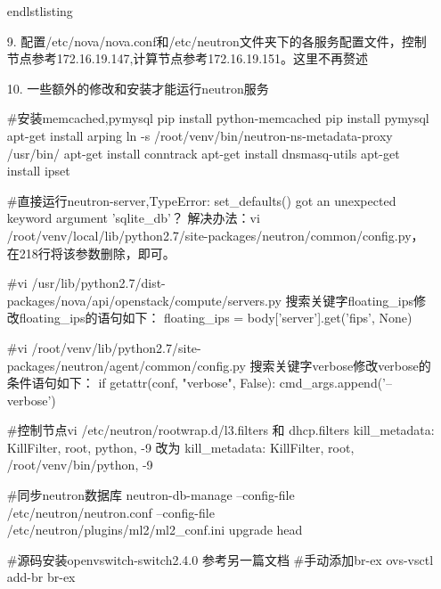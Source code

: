 \documentclass[a4paper,left=1.5cm,right=1.5cm,11pt]{article}
\begin{document}
\begin{itemize}
			end{lstlisting}	
		\item[9.]配置/etc/nova/nova.conf和/etc/neutron文件夹下的各服务配置文件，控制节点参考172.16.19.147,计算节点参考172.16.19.151。这里不再赘述
		\item[10.]一些额外的修改和安装才能运行neutron服务

			#安装memcached,pymysql
			pip install python-memcached
			pip install pymysql
			apt-get install arping 
			ln -s /root/venv/bin/neutron-ns-metadata-proxy /usr/bin/
			apt-get install conntrack
			apt-get install dnsmasq-utils
			apt-get install ipset

			#直接运行neutron-server,TypeError: set\_defaults() got an unexpected keyword argument 'sqlite_db'？
			解决办法：vi /root/venv/local/lib/python2.7/site-packages/neutron/common/config.py，在218行将该参数删除，即可。

			#vi /usr/lib/python2.7/dist-packages/nova/api/openstack/compute/servers.py
			搜索关键字floating_ips修改floating_ips的语句如下：
			floating_ips = body['server'].get('fips', None)

			#vi /root/venv/lib/python2.7/site-packages/neutron/agent/common/config.py  
			搜索关键字verbose修改verbose的条件语句如下：
			if getattr(conf, "verbose", False):
				cmd_args.append('--verbose')

			#控制节点vi /etc/neutron/rootwrap.d/l3.filters 和 dhcp.filters
			kill_metadata: KillFilter, root, python, -9
			改为
            kill_metadata: KillFilter, root, /root/venv/bin/python, -9

			#同步neutron数据库
			neutron-db-manage --config-file /etc/neutron/neutron.conf --config-file /etc/neutron/plugins/ml2/ml2\_conf.ini upgrade head

			#源码安装openvswitch-switch2.4.0
			参考另一篇文档
			#手动添加br-ex
			ovs-vsctl add-br br-ex
		
    \end{itemize}
\end{document}
